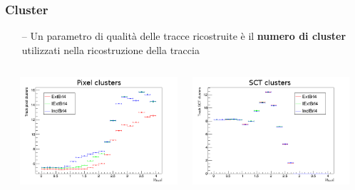 \documentclass{beamer}
\begin{document}
\begin{frame}
\frametitle{Cluster}
\begin{itemize}
\item[\color{black}--] Un parametro di qualit\`a delle tracce ricostruite \`e il \textbf{numero 
di cluster} utilizzati nella ricostruzione della traccia
\end{itemize}

\begin{columns}
\begin{column}{0.09\textwidth}
\end{column}
\begin{column}{0.41\textwidth}
\includegraphics[width=\textwidth]{Tracking/nPixHits_abseta2}
\end{column}
\begin{column}{0.41\textwidth}
\includegraphics[width=\textwidth]{Tracking/nSCTHits_abseta2}
\end{column}
\begin{column}{0.09\textwidth}
\end{column}
\end{columns}
\vskip-0.1cm


\end{frame}
\end{document}
